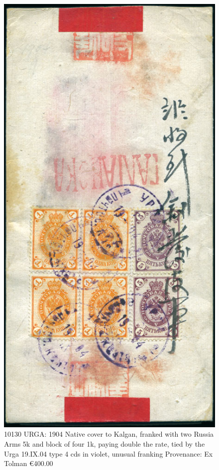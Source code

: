 \begin{figure}[htbp]
\centering
\includegraphics[width=.50\textwidth]{../russian-post-in-mongolia/10130.jpg}
\caption{ 
10130 URGA: 1904 Native cover to Kalgan, franked with two Russia Arms 5k 
and block of four 1k, paying double the rate, tied by the Urga 19.IX.04 
type 4 cds in violet, unusual franking
Provenance: Ex Tolman
\euro 400.00 
} 
\end{figure} 

